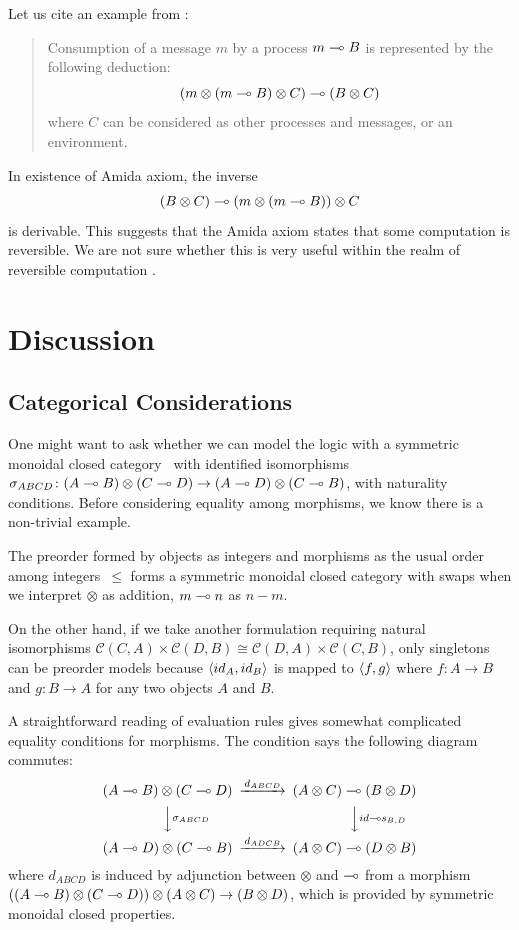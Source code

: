  Let us cite an example from \citet[A.2]{kobayashi-yonezawa}:
 \begin{quote}
  Consumption of a message $m$ by a process $m\multimap B$ is represented by
  the following deduction:
  \[
   (m\otimes(m\multimap B)\otimes C)\multimap (B\otimes C)
  \]
  where $C$ can be considered as other processes and messages, or an environment.
 \end{quote}
 In existence of Amida axiom,
 the inverse
 \[
  (B\otimes C)\multimap (m\otimes (m\multimap B))\otimes C
 \]
 is derivable.
 This suggests that the Amida axiom states that some
 computation is reversible.  We are not sure whether this is very
 useful within the realm of reversible computation .

\section{Discussion}

\subsection{Categorical Considerations}
One might want to ask whether we can model the logic with
a symmetric monoidal closed category~\citep{blute2004category}
  with identified isomorphisms
$\sigma_{ABCD}\colon (A\multimap B)\otimes (C\multimap D)\rightarrow (A\multimap D) \otimes
 (C\multimap B)$, with naturality conditions.
 Before considering equality among morphisms,
 we know there is a non-trivial example.
  \begin{example}
   The preorder formed by objects as integers and morphisms as the usual
   order among integers~$\le$
   forms a symmetric monoidal closed category with swaps
   when we interpret $\otimes$ as addition,
   $m \multimap n$ as $n-m$.
  \end{example}
  On the other hand,
  if we take another formulation requiring natural isomorphisms
  $\mathcal C(C,A)\times\mathcal C(D,B) \cong \mathcal C(D,A)\times
  \mathcal C{(C,B)}$,
  only singletons can be preorder models because $\langle{id_A,id_B}\rangle$ is
  mapped to $\langle{f,g}\rangle$ where $f\colon A\rightarrow B$ and $g\colon
  B\rightarrow A$ for any two objects $A$ and $B$.

A straightforward reading of evaluation rules gives somewhat complicated
equality conditions for morphisms.
The condition says the following diagram commutes:
\[
   \begin{CD}
    (A\limp B)\otimes (C\limp D) @>{d_{ABCD}}>> (A\otimes C)\limp(B\otimes D)\\
    @VV{\sigma_{ABCD}}V @VV{id\limp s_{B,D}}V\\
    (A\limp D)\otimes (C\limp B) @>{d_{ADCB}}>> (A\otimes C)\limp (D\otimes B)
   \end{CD}
\]
where $d_{ABCD}$ is induced by adjunction between $\otimes$ and $\multimap$
 from a morphism
 $((A\multimap B)\otimes (C\multimap D))\otimes (A\otimes C)\rightarrow
 (B\otimes D)$, which is provided by symmetric monoidal closed
 properties.


